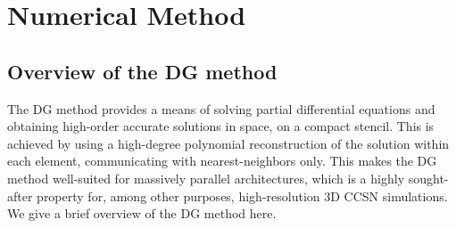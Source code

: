\documentclass[letterpaper]{jpconf}
\newcommand{\sd}[1]{\textcolor{red}{(SD: #1)}}
\begin{document}
 \section{Numerical Method}

 \subsection{Overview of the DG method}
 The DG method provides a means of solving partial differential equations and obtaining high-order accurate solutions in space, on a compact stencil. This is achieved by using a high-degree polynomial reconstruction of the solution within each element, communicating with nearest-neighbors only. This makes the DG method well-suited for massively parallel architectures, which is a highly sought-after property for, among other purposes, high-resolution 3D CCSN simulations. We give a brief overview of the DG method here.
\end{document}
